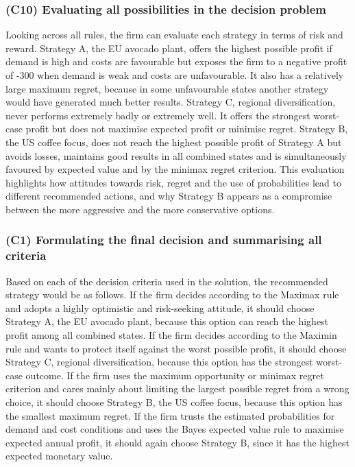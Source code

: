 \documentclass[11pt]{article}
\begin{document}
	\subsubsection{(C10) Evaluating all possibilities in the decision problem}\label{subsubsec:example2-c10}
	
	Looking across all rules, the firm can evaluate each strategy in terms of risk and reward. Strategy A, the EU avocado plant, offers the highest possible profit if demand is high and costs are favourable but exposes the firm to a negative profit of -300 when demand is weak and costs are unfavourable. It also has a relatively large maximum regret, because in some unfavourable states another strategy would have generated much better results. Strategy C, regional diversification, never performs extremely badly or extremely well. It offers the strongest worst-case profit but does not maximise expected profit or minimise regret. Strategy B, the US coffee focus, does not reach the highest possible profit of Strategy A but avoids losses, maintains good results in all combined states and is simultaneously favoured by expected value and by the minimax regret criterion. This evaluation highlights how attitudes towards risk, regret and the use of probabilities lead to different recommended actions, and why Strategy B appears as a compromise between the more aggressive and the more conservative options.
	
	\subsubsection{(C1) Formulating the final decision and summarising all criteria}\label{subsubsec:example2-c1}
	
	Based on each of the decision criteria used in the solution, the recommended strategy would be as follows. If the firm decides according to the Maximax rule and adopts a highly optimistic and risk-seeking attitude, it should choose Strategy A, the EU avocado plant, because this option can reach the highest profit among all combined states. If the firm decides according to the Maximin rule and wants to protect itself against the worst possible profit, it should choose Strategy C, regional diversification, because this option has the strongest worst-case outcome. If the firm uses the maximum opportunity or minimax regret criterion and cares mainly about limiting the largest possible regret from a wrong choice, it should choose Strategy B, the US coffee focus, because this option has the smallest maximum regret. If the firm trusts the estimated probabilities for demand and cost conditions and uses the Bayes expected value rule to maximise expected annual profit, it should again choose Strategy B, since it has the highest expected monetary value.
	
\end{document}

